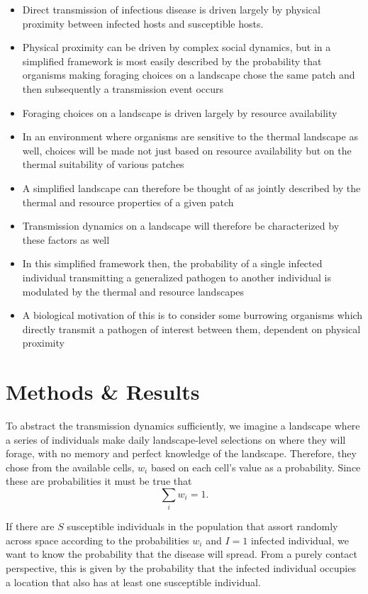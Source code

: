\begin{itemize}
    \item Direct transmission of infectious disease is driven largely by physical proximity between infected hosts and susceptible hosts. 
    \item Physical proximity can be driven by complex social dynamics, but in a simplified framework is most easily described by the probability that organisms making foraging choices on a landscape chose the same patch and then subsequently a transmission event occurs
    \item Foraging choices on a landscape is driven largely by resource availability
    \item In an environment where organisms are sensitive to the thermal landscape as well, choices will be made not just based on resource availability but on the thermal suitability of various patches
    \item A simplified landscape can therefore be thought of as jointly described by the thermal and resource properties of a given patch 
    \item Transmission dynamics on a landscape will therefore be characterized by these factors as well
    \item In this simplified framework then, the probability of a single infected individual transmitting a generalized pathogen to another individual is modulated by the thermal and resource landscapes
    \item A biological motivation of this is to consider some burrowing organisms which directly transmit a pathogen of interest between them, dependent on physical proximity
\end{itemize}

\section*{Methods \& Results}\label{s:methods-results}

To abstract the transmission dynamics sufficiently, we imagine a landscape where a series of individuals make daily landscape-level selections on where they will forage, with no memory and perfect knowledge of the landscape. Therefore, they chose from the available cells, $w_i$ based on each cell's value as a probability. Since these are probabilities it must be true that 
\begin{equation}
\sum_i w_{i}=1.
\end{equation}

If there are $S$ susceptible individuals in the population that assort randomly across space according to the probabilities $w_{i}$ and $I=1$ infected individual, we want to know the probability that the disease will spread. From a purely contact perspective, this is given by the probability that the infected individual occupies a location that also has at least one susceptible individual.

